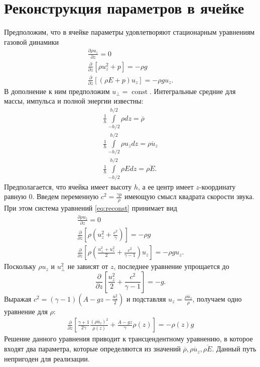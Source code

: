 \documentclass[12pt]{article}
\newcommand{\pd}[2]{\frac{\partial #1}{\partial #2}}
\begin{document}
\section{Реконструкция параметров в ячейке}
Предположим, что в ячейке параметры удовлетворяют стационарным уравнениям газовой динамики
\begin{equation}
\begin{gathered}
\pd{\rho u_z}{z} = 0\\
\pd{}{z}\left[\rho u_z^2 + p\right] = -\rho g\\
\pd{}{z}\left[(\rho E + p) u_z\right] = -\rho g u_z.
\end{gathered}
\label{eq:reconst}
\end{equation}
В дополнение к ним предположим $u_\bot = \operatorname{const}$. Интегральные средние для
массы, импульса и полной энергии известны:
\begin{gather*}
\frac{1}{h}\int\limits_{-h/2}^{h/2} \rho dz = \overline\rho\\
\frac{1}{h}\int\limits_{-h/2}^{h/2} \rho u_z dz = \overline{\rho u_z}\\
\frac{1}{h}\int\limits_{-h/2}^{h/2} \rho E dz = \overline{\rho E}.
\end{gather*}
Предполагается, что ячейка имеет высоту $h$, а ее центр имеет $z$-координату равную $0$.
Введем переменную $c^2 = \frac{\gamma p}{\rho}$ имеющую смысл квадрата скорости звука. При этом 
система уравнений \eqref{eq:reconst} принимает вид 
\begin{equation}
\begin{gathered}
\pd{\rho u_z}{z} = 0\\
\pd{}{z}\left[\rho \left(u_z^2 + \frac{c^2}{\gamma}\right)\right] = -\rho g\\
\pd{}{z}\left[\rho \left(\frac{u_\bot^2 + u_z^2}{2} + \frac{c^2}{\gamma-1}\right) u_z\right] = 
-\rho g u_z.
\end{gathered}
\label{eq:reconst2}
\end{equation}
Поскольку $\rho u_z$ и $u_\bot^2$ не зависят от $z$, последнее уравнение упрощается до
\[
\pd{}{z}\left[\frac{u_z^2}{2} + \frac{c^2}{\gamma-1}\right] = 
-g.
\]
Выражая $c^2 = (\gamma - 1) \left(A - g z - \frac{u_z^2}{2}\right)$
и подставляя $u_z = \frac{\overline{\rho u_z}}{\rho}$, получаем одно уравнение для $\rho$:
\begin{gather*}
\pd{}{z}\left[
\frac{\gamma + 1}{2\gamma}\frac{(\overline{\rho u_z})^2}{\rho(z)}
+\frac{A - gz}{\gamma}\rho(z)
\right] = -\rho(z) g
\end{gather*}
Решение данного уравнения приводит к трансцендентному уравнению, в которое входят два параметра, 
которые определяются из значений $\overline{\rho}, \overline{\rho u_z}, \overline{\rho E}$. Данный 
путь непригоден для реализации.
\end{document}
